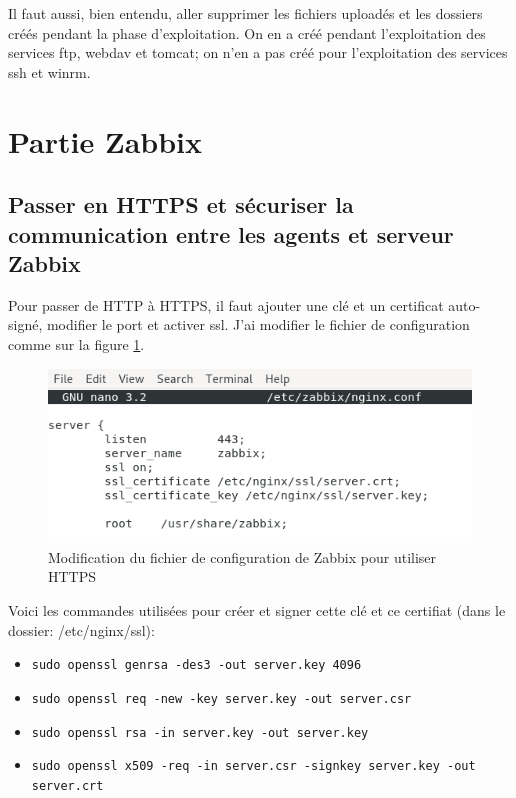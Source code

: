 \documentclass[a4paper]{article}
\begin{document}
Il faut aussi, bien entendu, aller supprimer les fichiers uploadés et les dossiers créés pendant la phase d'exploitation. On en a créé pendant l'exploitation des services ftp, webdav et tomcat; on n'en a pas créé pour l'exploitation des services ssh et winrm.















\newpage \section{Partie Zabbix}










\subsection{Passer en HTTPS et sécuriser la communication entre les agents et serveur Zabbix}





Pour passer de HTTP à HTTPS, il faut ajouter une clé et un certificat auto-signé, modifier le port et activer ssl. J'ai modifier le fichier de configuration comme sur la figure \ref{fig:zabbix62}.

\begin{figure}[H]
    \centering
    \includegraphics[width=0.55\linewidth]{images/zabbix-62.png}
    \caption{Modification du fichier de configuration de Zabbix pour utiliser HTTPS}
    \label{fig:zabbix62}
\end{figure}

Voici les commandes utilisées pour créer et signer cette clé et ce certifiat (dans le dossier: /etc/nginx/ssl):
\begin{itemize}
    \item \texttt{\footnotesize sudo openssl genrsa -des3 -out server.key 4096}
    \item \texttt{\footnotesize sudo openssl req -new -key server.key -out server.csr}
    \item \texttt{\footnotesize sudo openssl rsa -in server.key -out server.key}
    \item \texttt{\footnotesize sudo openssl x509 -req -in server.csr -signkey server.key -out server.crt}
\end{itemize}
\end{document}
